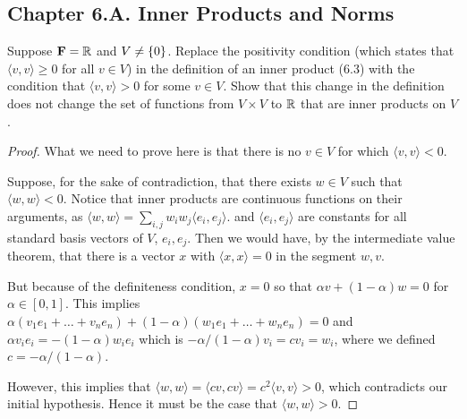 \subsection*{Chapter 6.A. Inner Products and Norms}


\begin{exercise}{3}
  Suppose $\mathbf{F}=\mathbb{R}$ and $V\neq\{0\}$. Replace the positivity condition (which states that $\langle v, v\rangle\geq 0$ for all $v\in V$) in the definition of an inner product (6.3) with the condition that $\langle v, v\rangle>0$ for some $v\in V$. Show that this change in the definition does not change the set of functions from $V\times V$ to $\mathbb{R}$ that are inner products on $V$.
\end{exercise}
\begin{proof}
 What we need to prove here is that there is no $v\in V$ for which $\langle v, v\rangle<0$. 
 
 Suppose, for the sake of contradiction, that there exists $w\in V$ such that $\langle w, w\rangle<0$. Notice that inner products are continuous functions on their arguments, as $\langle w,w\rangle =\sum_{i,j}w_iw_j\langle e_i, e_j\rangle$. and $\langle e_i,e_j\rangle$ are constants for all standard basis vectors  of $V$, $e_i,e_j$. Then we would have, by the intermediate value theorem, that there is a vector $x$ with $\langle x,x\rangle =0$ in the segment $w,v$. 
 
 But because of the definiteness condition, $x=0$ so that $\alpha v +(1-\alpha) w=0$ for $\alpha\in [0,1]$. This implies $\alpha(v_1e_1+\dots+v_ne_n)+(1-\alpha)(w_1e_1+\dots+w_ne_n)=0$ and $\alpha v_ie_i=-(1-\alpha)w_ie_i$ which is $-\alpha/(1-\alpha)v_i=cv_i=w_i$, where we defined $c=-\alpha/(1-\alpha)$.

 However, this implies that $\langle w,w\rangle = \langle cv,cv\rangle = c^2\langle v,v\rangle > 0$, which contradicts our initial hypothesis. Hence it must be the case that $\langle w,w\rangle>0$.
\end{proof}

